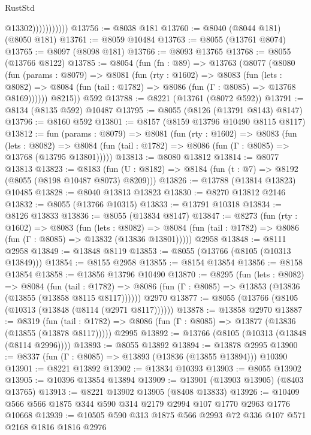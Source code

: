 \begin{lexlean}{RustStd}
\begin{coremodule}
                          @13302)))))))))))
@13756 := @8038 @181
@13760 := @8040 (@8044 @181) (@8050 @181)
@13761 := @8059 @10484
@13763 := @8055 (@13761 @8074)
@13765 := @8097 (@8098 @181)
@13766 := @8093 @13765
@13768 := @8055 (@13766 @8122)
@13785 := @8054
    (fun (fn : @89) =>
    @13763
      (@8077
        (@8080
          (fun (params : @8079) =>
          @8081
            (fun (rty : @1602) =>
            @8083
              (fun (lets : @8082) =>
              @8084 (fun (tail : @1782) => @8086 (fun (Γ : @8085) => @13768 @8169))))))
        @8215))
    @592
@13788 := @8221 (@13761 (@8072 @592))
@13791 := @8134 (@8135 @592) @10487
@13795 := @8055 (@8126 (@13791 @8143) @8147)
@13796 := @8160 @592
@13801 := @8157 (@8159 @13796 @10490 @8115 @8117)
@13812 := fun (params : @8079) =>
  @8081
    (fun (rty : @1602) =>
    @8083
      (fun (lets : @8082) =>
      @8084 (fun (tail : @1782) => @8086 (fun (Γ : @8085) => @13768 (@13795 @13801)))))
@13813 := @8080 @13812
@13814 := @8077 @13813
@13823 := @8183
    (fun (U : @8182) => @8184 (fun (t : @7) => @8192 (@8055 (@8198 @10487 @8073) @8209)))
@13826 := @13788 (@13814 @13823) @10485
@13828 := @8040 @13813 @13823
@13830 := @8270 @13812 @2146
@13832 := @8055 (@13766 @10315)
@13833 := @13791 @10318
@13834 := @8126 @13833
@13836 := @8055 (@13834 @8147)
@13847 := @8273
    (fun (rty : @1602) =>
    @8083
      (fun (lets : @8082) =>
      @8084 (fun (tail : @1782) => @8086 (fun (Γ : @8085) => @13832 (@13836 @13801)))))
    @2958
@13848 := @8111 @2958
@13849 := @13848 @8119
@13853 := @8055 (@13766 (@8105 (@10313 @13849)))
@13854 := @8155 @2958
@13855 := @8154 @13854
@13856 := @8158 @13854
@13858 := @13856 @13796 @10490
@13870 := @8295
    (fun (lets : @8082) =>
    @8084
      (fun (tail : @1782) =>
      @8086 (fun (Γ : @8085) => @13853 (@13836 (@13855 (@13858 @8115 @8117))))))
    @2970
@13877 := @8055 (@13766 (@8105 (@10313 (@13848 (@8114 (@2971 @8117))))))
@13878 := @13858 @2970
@13887 := @8319
    (fun (tail : @1782) => @8086 (fun (Γ : @8085) => @13877 (@13836 (@13855 (@13878 @8117)))))
    @2995
@13892 := @13766 (@8105 (@10313 (@13848 (@8114 @2996))))
@13893 := @8055 @13892
@13894 := @13878 @2995
@13900 := @8337 (fun (Γ : @8085) => @13893 (@13836 (@13855 @13894))) @10390
@13901 := @8221 @13892
@13902 := @13834 @10393
@13903 := @8055 @13902
@13905 := @10396 @13854 @13894
@13909 := @13901 (@13903 @13905) (@8403 @13765)
@13913 := @8221 @13902 @13905 (@8408 @13833)
@13926 := @10409 @566 @566 @1875 @344 @590 @314 @2179 @2994 @107 @1770 @2963 @1776 @10668
@13939 := @10505 @590 @313 @1875 @566 @2993 @72 @336 @107 @571 @2168 @1816 @1816 @2976

\end{coremodule}
\end{lexlean}
